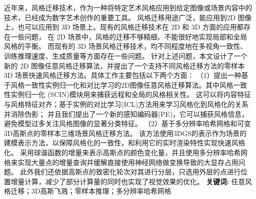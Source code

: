 \cleardoublepage
{}

\setlength{\parindent}{2em} 
近年来，风格迁移技术，作为一种将特定艺术风格应用到给定图像或场景内容中的技术，已经成为数字艺术创作的重要工具。
风格迁移用途广泛，能应用到2D 图像上，也可以应用到 3D 场景上。现有的风格迁移技术在 2D 和 3D 方面的应用都存在一些问题，
在 2D 场景中，风格的迁移不够精细、不能很好地实现局部和全局风格的平衡。
而现有的 3D 场景风格迁移技术，均不同程度地在多视角一致性、训练推理速度、生成质量等方面存在一些问题。
针对上述问题，本文设计了一个新的 2D 图像任意风格迁移算法，并提出了一个支持不同风格迁移方法的零样本 3D 场景快速风格迁移方法。具体工作主要包括以下两个方面：
\newline \indent（1）提出一种基于风格一致性实例归一化和对比学习的2D图像任意风格迁移算法。其中风格一致性实例归一化 (SCIN)模块用来捕获远程和全局的风格相关性。
这可以将内容特征与风格特征对齐；基于实例的对比学习(ICL)方法用来学习风格化到风格化的关系并消除伪影；
并且我们提出了一个新的感知编码器(PE)，它可以捕获风格信息，避免模型过多关注风格图像的显著分类特征。   
\newline \indent（2）基于多分辨率哈希网格和可变3D高斯点的零样本三维场景风格迁移方法。
该方法使用3DGS的表示作为场景的建模表示方法，以保障风格化的一致性，和利用它的实时渲染特性实现快速风格化。
采用球谐函数的增量来表示高斯点的颜色变化量，并且使用多分辨率哈希网格来实现大量点的增量查询并缓解直接使用神经网络做变换导致的大显存占用问题。
此外我们还依据高斯点的致密化轮次对其进行分层，只选用外层的点进行位置增量计算，减少了部分计算量的同时也实现了视觉效果的优化。
\newline
{\textbf{关键词:}}
任意风格迁移；3D高斯飞溅；零样本推理；多分辨率哈希网格

